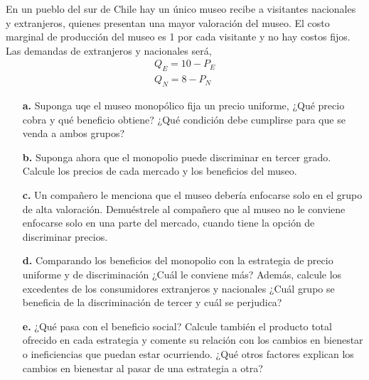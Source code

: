 \documentclass{exam}
\begin{document}
En un pueblo del sur de Chile hay un único museo recibe a visitantes nacionales y extranjeros, quienes presentan una mayor valoración del museo. El costo marginal de producción del museo es 1 por cada visitante y no hay costos fijos. Las demandas de extranjeros y nacionales será,
\begin{align*}
    Q_E = 10-P_E \\
    Q_N = 8 - P_N
\end{align*}
\begin{itemize}
    \item[\textbf{a.}] Suponga uqe el museo monopólico fija un precio uniforme, ¿Qué precio cobra y qué beneficio obtiene? ¿Qué condición debe cumplirse para que se venda a ambos grupos?
    \item[\textbf{b.}] Suponga ahora que el monopolio puede discriminar en tercer grado. Calcule los precios de cada mercado y los beneficios del museo.
    \item[\textbf{c.}] Un compañero le menciona que el museo debería enfocarse solo en el grupo de alta valoración. Demuéstrele al compañero que al museo no le conviene enfocarse solo en una parte del mercado, cuando tiene la opción de discriminar precios. 
    \item[\textbf{d.}] Comparando los beneficios del monopolio con la estrategia de precio uniforme y de discriminación ¿Cuál le conviene más? Además, calcule los excedentes de los consumidores extranjeros y nacionales ¿Cuál grupo se beneficia de la discriminación de tercer y cuál se perjudica?
    \item[\textbf{e.}] ¿Qué pasa con el beneficio social? Calcule también el producto total ofrecido en cada estrategia y comente su relación con los cambios en bienestar o ineficiencias que puedan estar ocurriendo. ¿Qué otros factores explican los cambios en bienestar al pasar de una estrategia a otra?
\end{itemize}
\end{document}
